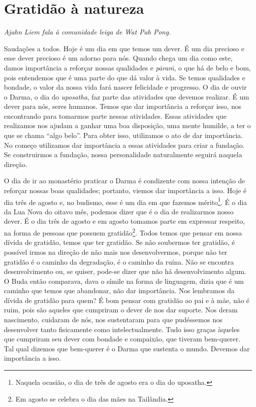 
\chapter{Gratidão à natureza}

{\itshape
Ajahn Liem fala à comunidade leiga de Wat Pah Pong.}

Saudações a todos. Hoje é um dia em que temos um dever. É um dia
precioso e esse dever precioso é um adorno para nós. Quando chega um
dia como este, damos importância a reforçar nossas qualidades e
\textit{p\=aram\=\is}, o que há de belo e bom, pois entendemos que é
uma parte do que dá valor à vida. Se temos qualidades e bondade, o
valor da nossa vida fará nascer felicidade e progresso. O dia de ouvir
o Darma, o dia do \textit{uposatha}, faz parte das atividades que
devemos realizar. É um dever para nós, seres humanos. Temos que dar
importância a reforçar isso, nos encontrando para tomarmos parte nessas
atividades. Essas atividades que realizamos nos ajudam a ganhar uma boa
disposição, uma mente humilde, a ter o que se chama “algo belo”. Para
obter isso, utilizamos o ato de dar importância. No começo utilizamos
dar importância a essas atividades para criar a fundação. Se
construirmos a fundação, nossa personalidade naturalmente seguirá
naquela direção. 

O dia de ir ao monastério praticar o Darma é condizente com nossa
intenção de reforçar nossas boas qualidades; portanto, viemos dar
importância a isso. Hoje é dia três de agosto e, no budismo, esse é um
dia em que fazemos mérito\footnote{Naquela ocasião, o dia de três de
agosto era o dia do uposatha.}. É o dia da Lua Nova do oitavo mês,
podemos dizer que é o dia de realizarmos nosso dever. É o dia três de
agosto e em agosto tomamos parte em expressar respeito, na forma de
pessoas que possuem gratidão\footnote{Em agosto se celebra o dia das
mães na Tailândia.}. Todos temos que pensar em nossa dívida de
gratidão, temos que ter gratidão. Se não soubermos ter gratidão, é
possível irmos na direção de não mais nos desenvolvermos, porque não
ter gratidão é o caminho da degradação, é o caminho da ruína. Não se
encontra desenvolvimento ou, se quiser, pode-se dizer que não há
desenvolvimento algum. O Buda então comparava, dava o símile na forma
de linguagem, dizia que é um caminho que temos que abandonar, não dar
importância. Nos lembramos da dívida de gratidão para quem? É bom
pensar com gratidão ao pai e à mãe, não é ruim, pois são aqueles que
cumpriram o dever de nos dar suporte. Nos deram nascimento, cuidaram de
nós, nos sustentaram para que pudéssemos nos desenvolver tanto
fisicamente como intelectualmente. Tudo isso graças àqueles que
cumpriram seu dever com bondade e compaixão, que tiveram bem-querer.
Tal qual dizemos que bem-querer é o Darma que sustenta o mundo. Devemos
dar importância a isso. 


